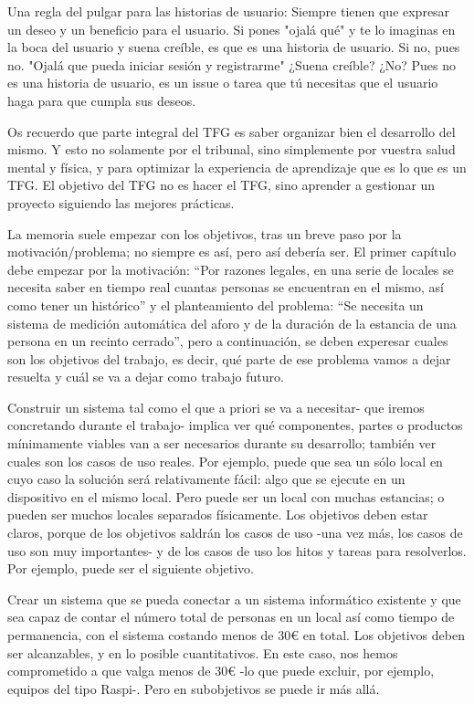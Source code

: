 Una regla del pulgar para las historias de usuario: Siempre 
tienen que expresar un deseo y un beneficio para el usuario. 
Si pones "ojalá qué" y te lo imaginas en la boca del usuario 
y suena creíble, es que es una historia de usuario. Si no, pues no.
"Ojalá que pueda iniciar sesión y registrarme" ¿Suena creíble? ¿No? 
Pues no es una historia de usuario, es un issue o tarea que 
tú necesitas que el usuario haga para que cumpla sus deseos.

Os recuerdo que parte integral del TFG es saber organizar 
bien el desarrollo del mismo. Y esto no solamente por el tribunal, 
sino simplemente por vuestra salud mental y física, y para 
optimizar la experiencia de aprendizaje que es lo que es un 
TFG. El objetivo del TFG no es hacer el TFG, sino aprender 
a gestionar un proyecto siguiendo las mejores prácticas.

La memoria suele empezar con los objetivos, tras un breve paso 
por la motivación/problema; no siempre es así, pero 
así debería ser. El primer capítulo debe empezar por 
la motivación: “Por razones legales, en una serie de locales 
se necesita saber en tiempo real cuantas personas se encuentran 
en el mismo, así como tener un histórico” y el planteamiento 
del problema: “Se necesita un sistema de medición automática 
del aforo y de la duración de la estancia de una persona 
en un recinto cerrado”, pero a continuación, se deben 
experesar cuales son los objetivos del trabajo, es decir, 
qué parte de ese problema vamos a dejar resuelta y cuál 
se va a dejar como trabajo futuro.

Construir un sistema tal como el que a priori se va a necesitar- que 
iremos concretando durante el trabajo- implica ver qué componentes, 
partes o productos mínimamente viables van a ser necesarios 
durante su desarrollo; también ver cuales son los casos de uso 
reales. Por ejemplo, puede que sea un sólo local en cuyo caso 
la solución será relativamente fácil: algo que se ejecute en 
un dispositivo en el mismo local. Pero puede ser un local 
con muchas estancias; o pueden ser muchos locales separados 
físicamente. Los objetivos deben estar claros, porque de 
los objetivos saldrán los casos de uso -una vez más, los casos 
de uso son muy importantes- y de los casos de uso los 
hitos y tareas para resolverlos. Por ejemplo, puede ser 
el siguiente objetivo.

Crear un sistema que se pueda conectar a un sistema informático 
existente y que sea capaz de contar el número total de 
personas en un local así como tiempo de permanencia, 
con el sistema costando menos de 30€ en total.
Los objetivos deben ser alcanzables, y en lo posible 
cuantitativos. En este caso, nos hemos comprometido 
a que valga menos de 30€ -lo que puede excluir, por ejemplo, 
equipos del tipo Raspi-. Pero en subobjetivos se puede ir más allá.

